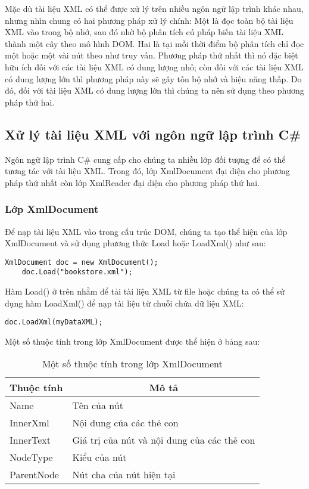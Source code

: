 Mặc dù tài liệu XML có thể được xử lý trên nhiều ngôn ngữ lập trình khác nhau, nhưng nhìn chung có hai phương pháp xử lý chính: Một là đọc toàn bộ tài liệu XML vào trong bộ nhớ, sau đó nhờ bộ phân tích cú pháp biến tài liệu XML thành một cây theo mô hình DOM. Hai là tại mỗi thời điểm bộ phân tích chỉ đọc một hoặc một vài nút theo như truy vấn. Phương pháp thứ nhất thì nó đặc biệt hữu ích đối với các tài liệu XML có dung lượng nhỏ; còn đối với các tài liệu XML có dung lượng lớn thì phương pháp này sẽ gây tốn bộ nhớ và hiệu năng thấp. Do đó, đối với tài liệu XML có dung lượng lớn thì chúng ta nên sử dụng theo phương pháp thứ hai.
\subsection{Xử lý tài liệu XML với ngôn ngữ lập trình C\#}
Ngôn ngữ lập trình C\# cung cấp cho chúng ta nhiều lớp đối tượng để có thể tương tác với tài liệu XML. Trong đó, lớp XmlDocument đại diện cho phương pháp thứ nhất còn lớp XmlReader đại diện cho phương pháp thứ hai.
\subsubsection{Lớp XmlDocument}
Để nạp tài liệu XML vào trong cấu trúc DOM, chúng ta tạo thể hiện của lớp XmlDocument và sử dụng phương thức {\ttfamily  Load} hoặc {\ttfamily LoadXml()} như sau:
\lstset{language=XML}
\begin{lstlisting}[escapechar=`]
	XmlDocument doc = new XmlDocument();
	doc.Load("bookstore.xml");
\end{lstlisting}

Hàm {\ttfamily  Load()} ở trên nhằm để tải tài liệu XML từ file hoặc chúng ta có thể sử dụng hàm {\ttfamily  LoadXml()} để nạp tài liệu từ chuỗi chứa dữ liệu XML:
\lstset{language=XML}
\begin{lstlisting}[escapechar=`]
	doc.LoadXml(myDataXML);
\end{lstlisting}

Một số thuộc tính trong lớp XmlDocument được thể hiện ở bảng sau:

\begin{center}
\begin{longtable}{|m{3cm}|m{5cm}|}
\caption [Một số thuộc tính trong lớp XmlDocument]{Một số thuộc tính trong lớp XmlDocument}
   \endfirsthead
   \endhead
\hline
\multicolumn{1}{|c|}{\textbf{Thuộc tính}} &	\multicolumn{1}{c|}{ \textbf{Mô tả}} \\ \hline
Name &	Tên của nút\\ \hline
InnerXml &	Nội dung của các thẻ con\\ \hline
InnerText &	Giá trị của nút và nội dung của các thẻ con\\ \hline
NodeType &	Kiểu của nút \\ \hline
ParentNode &	Nút cha của nút hiện tại \\ \hline

\end{longtable}
\end{center} 


